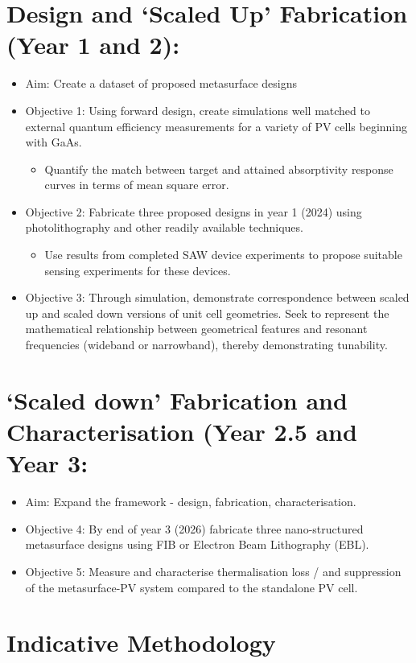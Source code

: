 \section*{Design and `Scaled Up' Fabrication (Year 1 and 2):}
\begin{itemize}
	\item Aim: Create a dataset of proposed metasurface designs 
    \item Objective 1: Using forward design, create simulations well matched to external quantum efficiency measurements for a variety of PV cells beginning with GaAs.
    \begin{itemize}
        \item Quantify the match between target and attained absorptivity response curves in terms of mean square error.
    \end{itemize}
    \item Objective 2: Fabricate three proposed designs in year 1 (2024) using photolithography and other readily available techniques.
    \begin{itemize}
        \item Use results from completed SAW device experiments to propose suitable sensing experiments for these devices.
    \end{itemize} 
    \item Objective 3: Through simulation, demonstrate correspondence between scaled up and scaled down versions of unit cell geometries. Seek to represent the mathematical relationship between geometrical features and resonant frequencies (wideband or narrowband), thereby demonstrating tunability.
\end{itemize}
\section*{`Scaled down' Fabrication and Characterisation (Year 2.5 and Year 3:}
\begin{itemize}
	\item Aim: Expand the framework - design, fabrication, characterisation.
    \item Objective 4: By end of year 3 (2026) fabricate three nano-structured metasurface designs using FIB or Electron Beam Lithography (EBL).
    \item Objective 5: Measure and characterise thermalisation loss / and suppression of the metasurface-PV system compared to the standalone PV cell.
\end{itemize}
\section{Indicative Methodology}


